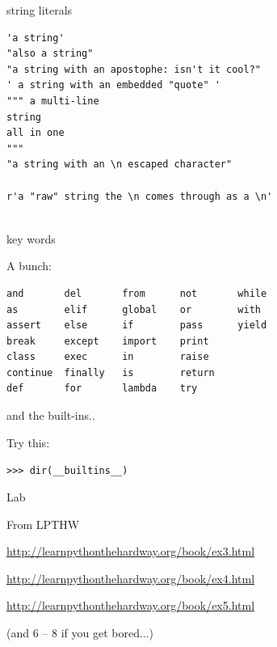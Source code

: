 \documentclass{beamer}
\begin{document}
\begin{frame}[fragile]{string literals}

\begin{verbatim}
'a string'
"also a string"
"a string with an apostophe: isn't it cool?"
' a string with an embedded "quote" '
""" a multi-line
string
all in one
"""
"a string with an \n escaped character"

r'a "raw" string the \n comes through as a \n'
 
\end{verbatim}

\end{frame}

\begin{frame}[fragile]{key words}

{\Large  A bunch:}

\vspace{0.2in}
\begin{verbatim}
and       del       from      not       while    
as        elif      global    or        with     
assert    else      if        pass      yield    
break     except    import    print              
class     exec      in        raise              
continue  finally   is        return             
def       for       lambda    try
\end{verbatim}

\end{frame}

\begin{frame}[fragile]{and the built-ins..}

{\Large  Try this: 

\vspace{0.2in}
\verb+>>> dir(__builtins__)+

}
\end{frame}


\begin{frame}[fragile]{Lab}

{\large From LPTHW }

\vspace{0.2in}
\url{http://learnpythonthehardway.org/book/ex3.html}

\vspace{0.2in}
\url{http://learnpythonthehardway.org/book/ex4.html}

\vspace{0.2in}
\url{http://learnpythonthehardway.org/book/ex5.html}

(and 6 -- 8 if you get bored...)

\end{frame}
\end{document}
